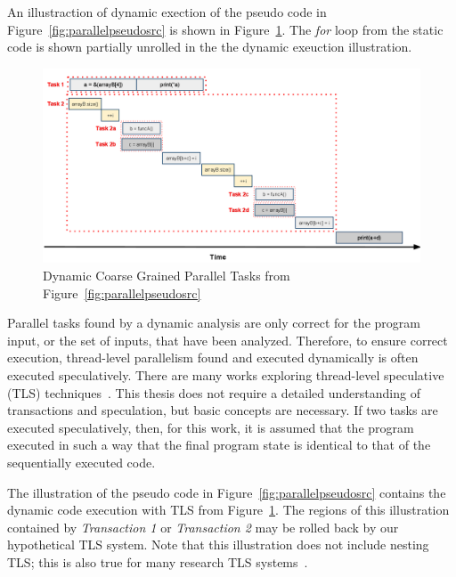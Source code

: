 \documentclass[defaultstyle,11pt]{thesis}
\begin{document}
An illustraction of dynamic exection of the pseudo code in
Figure~\ref{fig:parallelpseudosrc} is shown in
Figure~\ref{fig:parallelpseudocoarsedyn}.  The \textit{for} loop from
the static code is shown partially unrolled in the the dynamic
exeuction illustration.

\begin{figure}
\begin{center}
\includegraphics[width=5in]{images/ParallelTasksCoarseDyn}
\end{center}
\caption{Dynamic Coarse Grained Parallel Tasks from Figure~\ref{fig:parallelpseudosrc}}
\label{fig:parallelpseudocoarsedyn}
\end{figure}

Parallel tasks found by a dynamic analysis are only correct for the
program input, or the set of inputs, that have been analyzed.
Therefore, to ensure correct execution, thread-level parallelism found
and executed dynamically is often executed speculatively. There are
many works exploring thread-level speculative (TLS)
techniques~\cite{steffan:00:isca,vachharajani:07:pact,warg:2001:pact,wu:2008:cdp,chen:cc:2004,dou:2007:trans,wang:2009:dps,Rangan:2004kx,Ottoni:2005uq}.
This thesis does not require a detailed understanding of transactions
and speculation, but basic concepts are necessary.  If two tasks are
executed speculatively, then, for this work, it is assumed that the
program executed in such a way that the final program state is
identical to that of the sequentially executed code.

The illustration of the pseudo code in
Figure~\ref{fig:parallelpseudosrc} contains the dynamic code execution
with TLS from Figure~\ref{fig:parallelpseudocoarsedyn}.  The regions
of this illustration contained by \textit{Transaction 1} or
\textit{Transaction 2} may be rolled back by our hypothetical TLS
system.  Note that this illustration does not include nesting TLS;
this is also true for many research TLS
systems~\cite{prabhu:2005:ppopp}.
\end{document}
